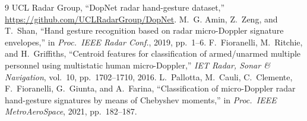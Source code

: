 \documentclass[10pt,a4paper,titlepage]{article}
\begin{document}
\clearpage
{} %
\begin{thebibliography}{9}
  UCL Radar Group, ``DopNet radar hand-gesture dataset,''
  \url{https://github.com/UCLRadarGroup/DopNet}.
  M.~G. Amin, Z.~Zeng, and T.~Shan, ``Hand gesture recognition based on radar
  micro-Doppler signature envelopes,'' in \emph{Proc.\ IEEE Radar Conf.},
  2019, pp.~1--6.
  F.~Fioranelli, M.~Ritchie, and H.~Griffiths, ``Centroid features for
  classification of armed/unarmed multiple personnel using multistatic human
  micro-Doppler,'' \emph{IET Radar, Sonar \& Navigation}, vol.~10,
  pp.~1702--1710, 2016.
  L.~Pallotta, M.~Cauli, C.~Clemente, F.~Fioranelli, G.~Giunta, and A.~Farina,
  ``Classification of micro-Doppler radar hand-gesture signatures by means of
  Chebyshev moments,'' in \emph{Proc.\ IEEE MetroAeroSpace}, 2021,
  pp.~182--187.
\end{thebibliography}
\end{document}
